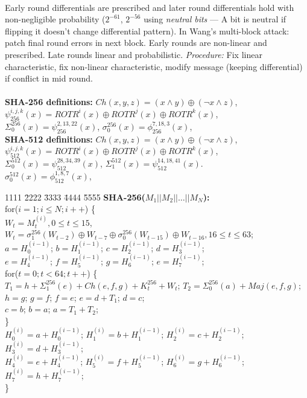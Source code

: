 \\
Early round differentials are
prescribed and later round differentials hold with non-negligible probability ($2^{-61}$,
$2^{-56}$ using \emph{neutral bits} --- A bit is neutral if flipping it doesn't change 
differential pattern).  
In Wang's multi-block attack:  patch final round errors in next block.
Early rounds are non-linear and prescribed.  Late rounds linear and probabilistic. 
\emph{Procedure:}  Fix linear characteristic, fix non-linear
characteristic, modify message (keeping differential) if conflict in mid round.
\\
\\
{\bf SHA-256 definitions:}
$Ch(x,y,z)= (x \wedge y) \oplus (\neg x \wedge z)$,  
$\psi_{256}^{i, j, k}(x)= ROTR^i (x) \oplus ROTR^j (x) \oplus ROTR^k (x)$,
$\Sigma_0^{256}(x)= \psi_{256}^{2, 13, 22} (x)$,
$\sigma_0^{256}(x)= \phi_{256}^{7, 18, 3} (x)$,
\\
{\bf SHA-512 definitions:}
$Ch(x,y,z)= (x \wedge y) \oplus (\neg x \wedge z)$,  
$\psi_{512}^{i, j, k}(x)= ROTR^i (x)  \oplus ROTR^j (x)  \oplus ROTR^k (x)$,
$\Sigma_0^{512}(x)= \psi_{512}^{28, 34, 39} (x)$,
$\Sigma_1^{512}(x)= \psi_{512}^{14, 18, 41} (x)$. \\
$\sigma_0^{512}(x)= \phi_{512}^{1,8,7} (x)$,
\begin{tabbing}
1111 \= 2222 \= 3333 \= 4444 \= 5555 \kill
{\bf SHA-256($M_1 || M_2 || \ldots || M_N$):}\\
for($i=1; i \le N; i++$)  \{\\
    \> $W_t= M_t^{(i)}, 0 \le t \le 15$,\\
    \> $W_t= \sigma_1^{256}(W_{t-2}) \oplus W_{t-7} \oplus \sigma_0^{256}(W_{t-15}) \oplus W_{t-16}, 16 \le t \le 63$;\\
    \> $a= H_0^{(i-1)}$; $b= H_1^{(i-1)}$; $c= H_2^{(i-1)}$; $d= H_3^{(i-1)}$; \\
    \> $e= H_4^{(i-1)}$; $f= H_5^{(i-1)}$; $g= H_6^{(i-1)}$; $e= H_7^{(i-1)}$; \\
    \> for($t=0; t<64;t++$) \{ \\
    \>   \> $T_1=h + \Sigma_1^{256}(e)+Ch(e,f,g)+K_t^{256}+W_t$; $T_2= \Sigma_0^{256}(a)+Maj(e,f,g)$; \\
    \>   \> $h= g$; $g= f$; $f=e$; $e= d+T_1$; $d=c$;\\
    \>   \> $c=b$; $b=a$; $a= T_1+T_2$; \\
    \>   \> \} \\
    \> $H_0^{(i)}= a+ H_0^{(i-1)}$; $H_1^{(i)}= b+ H_1^{(i-1)}$; $H_2^{(i)}= c+ H_2^{(i-1)}$; $H_3^{(i)}= d+ H_3^{(i-1)}$;\\
    \> $H_4^{(i)}= e+ H_4^{(i-1)}$; $H_5^{(i)}= f+ H_5^{(i-1)}$; $H_6^{(i)}= g+ H_6^{(i-1)}$; $H_7^{(i)}= h+ H_7^{(i-1)}$;\\
    \> \} 
\end{tabbing}
